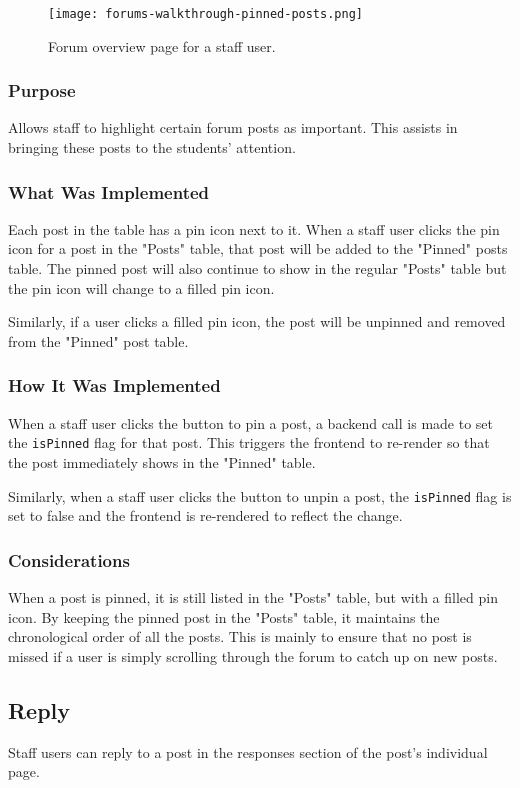 \begin{figure}[h!]
    \texttt{[image: forums-walkthrough-pinned-posts.png]}
    \centering
    \caption{Forum overview page for a staff user.}
\end{figure}

\subsubsection{Purpose}
Allows staff to highlight certain forum posts as important.
This assists in bringing these posts to the students' attention.

\subsubsection{What Was Implemented}
Each post in the table has a pin icon next to it.
When a staff user clicks the pin icon for a post in the "Posts" table, that post will be added to the "Pinned" posts table.
The pinned post will also continue to show in the regular "Posts" table but the pin icon will change to a filled pin icon.

Similarly, if a user clicks a filled pin icon, the post will be unpinned and removed from the "Pinned" post table.

\subsubsection{How It Was Implemented}
When a staff user clicks the button to pin a post, a backend call is made to set the \texttt{isPinned} flag for that post.
This triggers the frontend to re-render so that the post immediately shows in the "Pinned" table.

Similarly, when a staff user clicks the button to unpin a post, the \texttt{isPinned} flag is set to false and the frontend is re-rendered to reflect the change.

\subsubsection{Considerations}
When a post is pinned, it is still listed in the "Posts" table, but with a filled pin icon.
By keeping the pinned post in the "Posts" table, it maintains the chronological order of all the posts.
This is mainly to ensure that no post is missed if a user is simply scrolling through the forum to catch up on new posts.

\subsection{Reply}
Staff users can reply to a post in the responses section of the post's individual page.

